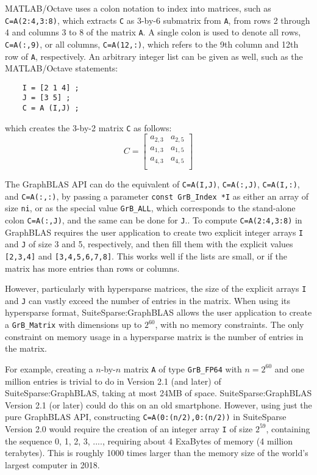 \documentclass[12pt]{article}
\begin{document}
MATLAB/Octave uses a colon notation to index into matrices, such as
\verb'C=A(2:4,3:8)', which extracts \verb'C' as 3-by-6 submatrix from \verb'A',
from rows 2 through 4 and columns 3 to 8 of the matrix \verb'A'.  A single
colon is used to denote all rows, \verb'C=A(:,9)', or all columns,
\verb'C=A(12,:)', which refers to the 9th column and 12th row of \verb'A',
respectively.  An arbitrary integer list can be given as well, such as the
MATLAB/Octave statements:

    {\footnotesize
    \begin{verbatim}
    I = [2 1 4] ;
    J = [3 5] ;
    C = A (I,J) ; \end{verbatim} }
\noindent
which creates the 3-by-2 matrix \verb'C' as follows:
\[
C =
\left[
\begin{array}{cc}
a_{2,3} & a_{2,5} \\
a_{1,3} & a_{1,5} \\
a_{4,3} & a_{4,5} \\
\end{array}
\right]
\]

The GraphBLAS API can do the equivalent of \verb'C=A(I,J)',
\verb'C=A(:,J)', \verb'C=A(I,:)', and \verb'C=A(:,:)', by passing a parameter
\verb'const GrB_Index *I' as either an array of size \verb'ni', or as the
special value \verb'GrB_ALL', which corresponds to the stand-alone colon
\verb'C=A(:,J)', and the same can be done for \verb'J'..  To compute
\verb'C=A(2:4,3:8)' in GraphBLAS requires the user application to create two
explicit integer arrays \verb'I' and \verb'J' of size 3 and 5, respectively,
and then fill them with the explicit values \verb'[2,3,4]' and
\verb'[3,4,5,6,7,8]'.  This works well if the lists are small, or if the matrix
has more entries than rows or columns.

However, particularly with hypersparse matrices, the size of the explicit
arrays \verb'I' and \verb'J' can vastly exceed the number of entries in the
matrix.  When using its hypersparse format, SuiteSparse:GraphBLAS allows the
user application to create a \verb'GrB_Matrix' with dimensions up to $2^{60}$,
with no memory constraints.  The only constraint on memory usage in a
hypersparse matrix is the number of entries in the matrix.

For example, creating a $n$-by-$n$ matrix \verb'A' of type \verb'GrB_FP64' with
$n=2^{60}$ and one million entries is trivial to do in Version 2.1 (and later)
of SuiteSparse:GraphBLAS, taking at most 24MB of space.  SuiteSparse:GraphBLAS
Version 2.1 (or later) could do this on an old smartphone.  However, using just
the pure GraphBLAS API, constructing \verb'C=A(0:(n/2),0:(n/2))'
in SuiteSparse Version 2.0 would require the creation of an integer array
\verb'I' of size $2^{59}$, containing the sequence 0, 1, 2, 3, ...., requiring
about 4 ExaBytes of memory (4 million terabytes).  This is roughly 1000 times
larger than the memory size of the world's largest computer in 2018.
\end{document}
